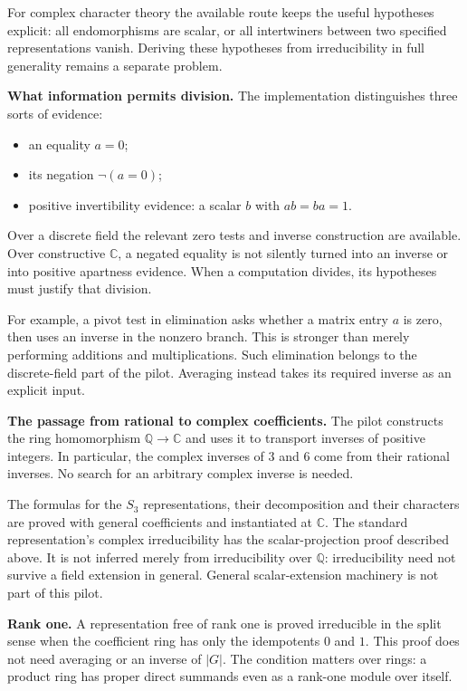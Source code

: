 \documentclass[11pt,a4paper]{article}
\newcommand{\Q}{\mathbb Q}
\newcommand{\C}{\mathbb C}
\begin{document}
For complex character theory the available route keeps the useful
hypotheses explicit: all endomorphisms are scalar, or all intertwiners
between two specified representations vanish. Deriving these hypotheses
from irreducibility in full generality remains a separate problem.

\textbf{What information permits division.}
The implementation distinguishes three sorts of evidence:
\begin{itemize}
  \item an equality $a=0$;
  \item its negation $\neg(a=0)$;
  \item positive invertibility evidence: a scalar $b$ with $ab=ba=1$.
\end{itemize}
Over a discrete field the relevant zero tests and inverse construction are
available. Over constructive $\C$, a negated equality is not silently turned
into an inverse or into positive apartness evidence. When a computation
divides, its hypotheses must justify that division.

For example, a pivot test in elimination asks whether a matrix entry $a$ is
zero, then uses an inverse in the nonzero branch. This is stronger than merely
performing additions and multiplications. Such elimination belongs to the
discrete-field part of the pilot. Averaging instead takes its required inverse
as an explicit input.

\textbf{The passage from rational to complex coefficients.}
The pilot constructs the ring homomorphism $\Q\to\C$ and uses it to transport
inverses of positive integers. In particular, the complex inverses of $3$
and $6$ come from their rational inverses. No search for an arbitrary
complex inverse is needed.

The formulas for the $S_3$ representations, their decomposition and their
characters are proved with general coefficients and instantiated at $\C$.
The standard representation's complex irreducibility has the scalar-projection
proof described above. It is not inferred merely from irreducibility over
$\Q$: irreducibility need not survive a field extension in general.
General scalar-extension machinery is not part of this pilot.

\textbf{Rank one.}
A representation free of rank one is proved irreducible in the split sense
when the coefficient ring has only the idempotents $0$ and $1$. This proof
does not need averaging or an inverse of $|G|$. The condition matters over
rings: a product ring has proper direct summands even as a rank-one module
over itself.
\end{document}
